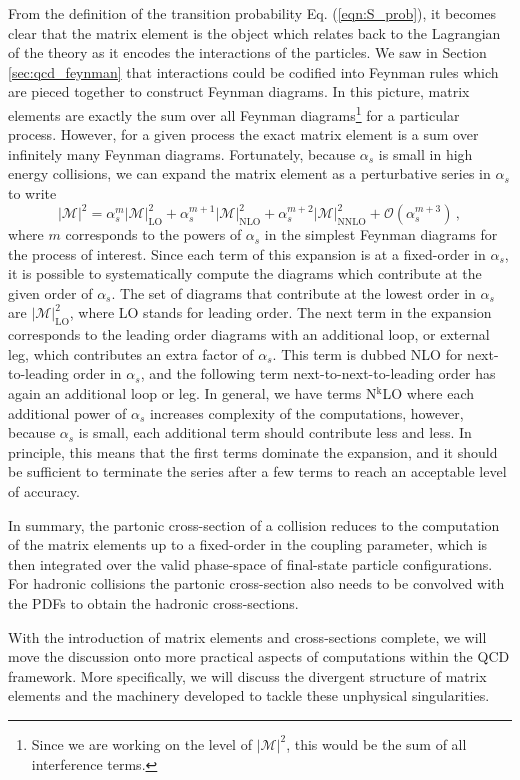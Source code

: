 \documentclass[main.tex]{subfiles}
\begin{document}
    From the definition of the transition probability
    Eq. (\ref{eqn:S_prob}), it becomes clear
    that the matrix element is the object which
    relates back to the Lagrangian of the theory
    as it encodes the interactions of the particles.
    We saw in Section \ref{sec:qcd_feynman} that
    interactions could be codified into Feynman
    rules which are pieced together to construct
    Feynman diagrams. In this picture, matrix elements
    are exactly the sum over all Feynman diagrams\footnote{Since we are working on the level
    of $|\mathcal{M}|^{2}$, this would
    be the sum of all interference terms.}
    for a particular process. However, for a given
    process the exact matrix element is a sum over
    infinitely many Feynman diagrams.
    Fortunately, because $\alpha_{s}$
    is small in high energy collisions, we can expand
    the matrix element as a perturbative series in
    $\alpha_{s}$ to write
    \begin{equation}\label{eqn:matrix_element}
        |\mathcal{M}|^{2} =  \alpha_{s}^{m} |\mathcal{M}|^{2}_{\mathrm{LO}} + \alpha_{s}^{m+1} |\mathcal{M}|^{2}_{\mathrm{NLO}} + \alpha_{s}^{m+2} |\mathcal{M}|^{2}_{\mathrm{NNLO}} + \mathcal{O}(\alpha_{s}^{m+3}) \, ,
    \end{equation}
    where $m$ corresponds to the powers of $\alpha_{s}$
    in the simplest Feynman diagrams
    for the process of interest.
    Since each term of this expansion is at a fixed-order
    in $\alpha_{s}$, it is possible to systematically
    compute the diagrams which contribute at the given order of $\alpha_{s}$.
    The set of diagrams that contribute at the lowest
    order in $\alpha_{s}$ are $|\mathcal{M}|^{2}_{\mathrm{LO}}$,
    where LO stands for leading order. The next term
    in the expansion corresponds to the leading order
    diagrams with an additional loop, or external leg,
    which contributes an extra factor of $\alpha_{s}$.
    This term is dubbed NLO for next-to-leading order
    in $\alpha_{s}$, and the following term
    next-to-next-to-leading order has again an additional
    loop or leg. In general, we have terms
    N$^{\mathrm{k}}$LO where each additional power of $\alpha_{s}$
    increases complexity of the computations, however,
    because $\alpha_{s}$ is small, each additional term
    should contribute less and less.
    In principle, this means that the first terms dominate the expansion,
    and it should be sufficient to terminate the series after
    a few terms to reach an acceptable level of accuracy.

    In summary, the partonic cross-section of a collision
    reduces to the computation of the matrix elements
    up to a fixed-order in the coupling parameter,
    which is then integrated over the valid phase-space of
    final-state particle configurations. For hadronic
    collisions the partonic cross-section also needs to
    be convolved with the PDFs to obtain the hadronic
    cross-sections.

    With the introduction of matrix elements and
    cross-sections complete, we will move the discussion onto
    more practical aspects of computations within the
    QCD framework. More specifically, we will discuss
    the divergent structure of matrix elements
    and the machinery developed to tackle these
    unphysical singularities.
\end{document}
